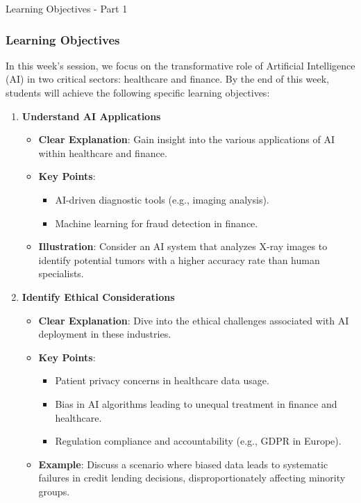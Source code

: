 \documentclass[aspectratio=169]{beamer}
\begin{document}
\begin{frame}[fragile]{Learning Objectives - Part 1}
    \frametitle{Learning Objectives}
    In this week's session, we focus on the transformative role of Artificial Intelligence (AI) in two critical sectors: healthcare and finance. By the end of this week, students will achieve the following specific learning objectives:
    
    \begin{enumerate}
        \item \textbf{Understand AI Applications}
            \begin{itemize}
                \item \textbf{Clear Explanation}: Gain insight into the various applications of AI within healthcare and finance.
                \item \textbf{Key Points}:
                    \begin{itemize}
                        \item AI-driven diagnostic tools (e.g., imaging analysis).
                        \item Machine learning for fraud detection in finance.
                    \end{itemize}
                \item \textbf{Illustration}: Consider an AI system that analyzes X-ray images to identify potential tumors with a higher accuracy rate than human specialists.
            \end{itemize}
        
        \item \textbf{Identify Ethical Considerations}
            \begin{itemize}
                \item \textbf{Clear Explanation}: Dive into the ethical challenges associated with AI deployment in these industries.
                \item \textbf{Key Points}:
                    \begin{itemize}
                        \item Patient privacy concerns in healthcare data usage.
                        \item Bias in AI algorithms leading to unequal treatment in finance and healthcare.
                        \item Regulation compliance and accountability (e.g., GDPR in Europe).
                    \end{itemize}
                \item \textbf{Example}: Discuss a scenario where biased data leads to systematic failures in credit lending decisions, disproportionately affecting minority groups.
            \end{itemize}
    \end{enumerate}
\end{frame}
\end{document}
